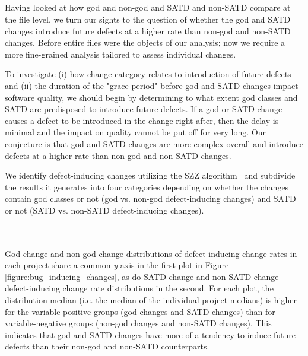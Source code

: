 \subsection*{\chapterIVrqII}


Having looked at how god and non-god and SATD and non-SATD compare at the file level, we turn our sights to the question of whether the god and SATD changes introduce future defects at a higher rate than non-god and non-SATD changes. Before entire files were the objects of our analysis; now we require a more fine-grained analysis tailored to assess individual changes.


To investigate (i) how change category relates to introduction of future defects and (ii) the duration of the "grace period" before god and SATD changes impact software quality, we should begin by determining to what extent god classes and SATD are predisposed to introduce future defects. If a god or SATD change causes a defect to be introduced in the change right after, then the delay is minimal and the impact on quality cannot be put off for very long. Our conjecture is that god and SATD changes are more complex overall and introduce defects at a higher rate than non-god and non-SATD changes.


We identify defect-inducing changes utilizing the SZZ algorithm~\cite{sliwerski-msr-2005} and subdivide the results it generates into four categories depending on whether the changes contain god classes or not (god vs. non-god defect-inducing changes) and SATD or not (SATD vs. non-SATD defect-inducing changes).\\ \\ \\



God change and non-god change distributions of defect-inducing change rates in each project share a common \textit{y}-axis in the first plot in Figure \ref{figure:bug_inducing_changes}, as do SATD change and non-SATD change defect-inducing change rate distributions in the second. For each plot, the distribution median (i.e. the median of the individual project medians) is higher for the variable-positive groups (god changes and SATD changes) than for variable-negative groups (non-god changes and non-SATD changes). This indicates that god and SATD changes have more of a tendency to induce future defects than their non-god and non-SATD counterparts.

